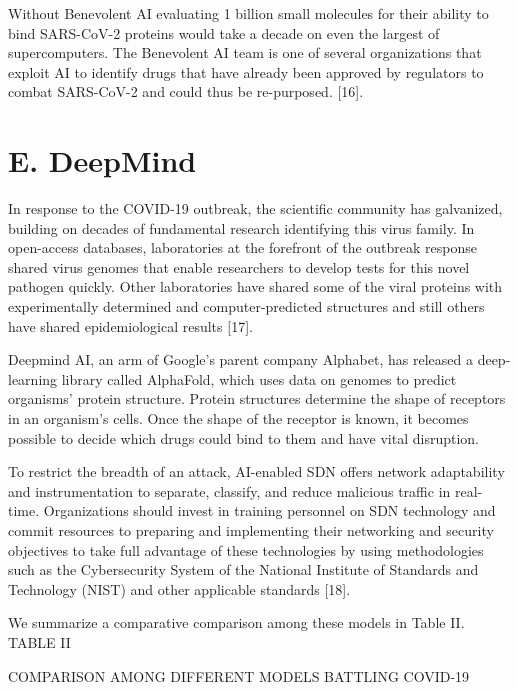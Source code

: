 \documentclass[10pt]{article}
\begin{document}
Without Benevolent AI evaluating 1 billion small molecules for their ability to bind SARS-CoV-2 proteins would take a decade on even the largest of supercomputers. The Benevolent AI team is one of several organizations that exploit AI to identify drugs that have already been approved by regulators to combat SARS-CoV-2 and could thus be re-purposed. [16].

\section{E. DeepMind}
In response to the COVID-19 outbreak, the scientific community has galvanized, building on decades of fundamental research identifying this virus family. In open-access databases, laboratories at the forefront of the outbreak response shared virus genomes that enable researchers to develop tests for this novel pathogen quickly. Other laboratories have shared some of the viral proteins with experimentally determined and computer-predicted structures and still others have shared epidemiological results [17].

Deepmind AI, an arm of Google's parent company Alphabet, has released a deep-learning library called AlphaFold, which uses data on genomes to predict organisms' protein structure. Protein structures determine the shape of receptors in an organism's cells. Once the shape of the receptor is known, it becomes possible to decide which drugs could bind to them and have vital disruption.

To restrict the breadth of an attack, AI-enabled SDN offers network adaptability and instrumentation to separate, classify, and reduce malicious traffic in real-time. Organizations should invest in training personnel on SDN technology and commit resources to preparing and implementing their networking and security objectives to take full advantage of these technologies by using methodologies such as the Cybersecurity System of the National Institute of Standards and Technology (NIST) and other applicable standards [18].

We summarize a comparative comparison among these models in Table II. TABLE II

COMPARISON AMONG DIFFERENT MODELS BATTLING COVID-19
\end{document}
